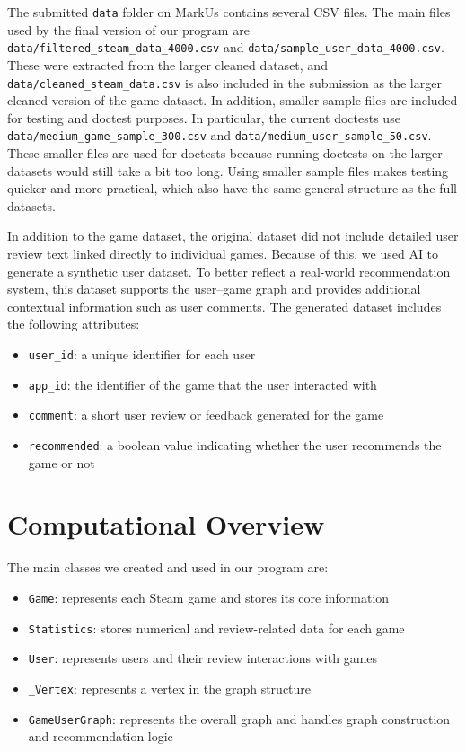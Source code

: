 \documentclass[fontsize=11pt]{article}
\begin{document}
The submitted \texttt{data} folder on MarkUs contains several CSV files. The main files used by the final version of our program are \texttt{data/filtered\_steam\_data\_4000.csv} and \texttt{data/sample\_user\_data\_4000.csv}. These were extracted from the larger cleaned dataset, and \texttt{data/cleaned\_steam\_data.csv} is also included in the submission as the larger cleaned version of the game dataset. In addition, smaller sample files are included for testing and doctest purposes. In particular, the current doctests use \texttt{data/medium\_game\_sample\_300.csv} and \texttt{data/medium\_user\_sample\_50.csv}. These smaller files are used for doctests because running doctests on the larger datasets would still take a bit too long. Using smaller sample files makes testing quicker and more practical, which also have the same general structure as the full datasets.

In addition to the game dataset, the original dataset did not include detailed user review text linked directly to individual games. Because of this, we used AI to generate a synthetic user dataset. To better reflect a real-world recommendation system, this dataset supports the user--game graph and provides additional contextual information such as user comments. The generated dataset includes the following attributes:
\begin{itemize}
    \item \texttt{user\_id}: a unique identifier for each user
    \item \texttt{app\_id}: the identifier of the game that the user interacted with
    \item \texttt{comment}: a short user review or feedback generated for the game
    \item \texttt{recommended}: a boolean value indicating whether the user recommends the game or not
\end{itemize}

\newpage
\section{Computational Overview}

The main classes we created and used in our program are:
\begin{itemize}
    \item \texttt{Game}: represents each Steam game and stores its core information
    \item \texttt{Statistics}: stores numerical and review-related data for each game
    \item \texttt{User}: represents users and their review interactions with games
    \item \texttt{\_Vertex}: represents a vertex in the graph structure
    \item \texttt{GameUserGraph}: represents the overall graph and handles graph construction and recommendation logic
\end{itemize}
\end{document}
